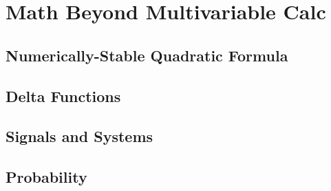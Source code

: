 \chapter{Math Beyond Multivariable Calc}
\section{Numerically-Stable Quadratic Formula}
\section{Delta Functions}
\section{Signals and Systems}
\section{Probability}

\newpage

